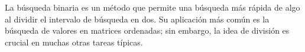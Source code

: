 La búsqueda binaria es un método que permite una búsqueda más rápida de algo al dividir el intervalo de búsqueda en dos. Su aplicación más común es la búsqueda de valores en matrices ordenadas; sin embargo, la idea de división es crucial en muchas otras tareas típicas.
